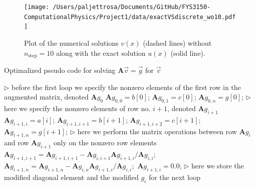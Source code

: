 \documentclass[english,notitlepage]{revtex4-1}  %
\begin{document}
\begin{figure}[h!]
    \centering 
    \texttt{[image: /Users/paljettrosa/Documents/GitHub/FYS3150-ComputationalPhysics/Project1/data/exactVSdiscrete\_wo10.pdf]} %
    \caption{Plot of the numerical solutions $v(x)$ (dashed lines) without $n_\text{step} = 10$ along with the exact solution $u(x)$ (solid line).}
    \label{plot7b w/o 10}
\end{figure}

\begin{algorithm}[H]
    \caption{Optimalized pseudo code for solving $\textbf{A}\vec{v} = \vec{g}$ for $\vec{v}$}\label{algorithm fixed}
    \begin{algorithmic}
        \State $\triangleright$ before the first loop we specify the nonzero elements of the first row in the augmented matrix, denoted $\textbf{A}g_0$
        \State $\textbf{A}g_{0,0} = b[0]$; 
        \State $\textbf{A}g_{0,1} = c[0]$; 
        \State $\textbf{A}g_{0,n} = g[0]$; 
        \State
         
        \State $\triangleright$ here we specify the nonzero elements of row no. $i+1$, denoted $\textbf{A}g_{i+1}$
        \State $\textbf{A}g_{i+1,i} = a[i]$; 
        \State $\textbf{A}g_{i+1,i+1} = b[i+1]$; 
         
        \State $\textbf{A}g_{i+1,i+2} = c[i+1]$; 
        \EndIf
        \State $\textbf{A}g_{i+1,n} = g[i+1]$; 
        \State
        \State $\triangleright$ here we perform the matrix operations between row $\textbf{A}g_{i}$ and row $\textbf{A}g_{i+1}$ only on the nonzero row elements
        \State $\textbf{A}g_{i+1,i+1} = \textbf{A}g_{i+1,i+1} - \textbf{A}g_{i,i+1} \textbf{A}g_{i+1,i} / \textbf{A}g_{i,i}$; 
        \State $\textbf{A}g_{i+1,n} = \textbf{A}g_{i+1,n} - \textbf{A}g_{i,n} \textbf{A}g_{i+1,i} / \textbf{A}g_{i,i};$ 
        \State $\textbf{A}g_{i+1,i} = 0.0$; 
        \State
        \State $\triangleright$ here we store the modified diagonal element and the modified $g_i$ for the next loop

\end{algorithmic}
\end{algorithm}
\end{document}
